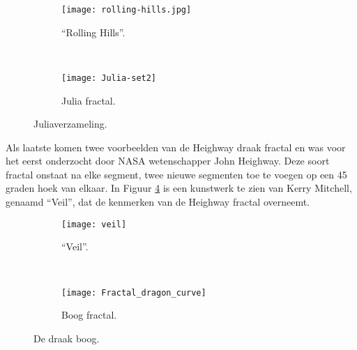 \documentclass{article}
\begin{document}
\begin{figure}[Hh]
    \centering
    \begin{subfigure}[b]{0.48\textwidth}
        \texttt{[image: rolling-hills.jpg]}
        \caption{``Rolling Hills''.}
        \label{fig:rolling-hills}
    \end{subfigure}
    ~ 
    \begin{subfigure}[b]{0.48\textwidth}
        \texttt{[image: Julia-set2]}
        \caption{Julia fractal.}
        \label{fig:julia-fractal}
    \end{subfigure}%
    \caption{Juliaverzameling.}
    \label{fig:julia-sets}
\end{figure}

Als laatste komen twee voorbeelden van de Heighway draak fractal en was voor het eerst onderzocht door NASA wetenschapper John Heighway. Deze soort fractal onstaat na elke segment, twee nieuwe segmenten toe te voegen op een 45 graden hoek van elkaar. In Figuur \ref{fig:veil} is een kunstwerk te zien van Kerry Mitchell, genaamd ``Veil'', dat de kenmerken van de Heighway fractal overneemt.

\begin{figure}[Hh]
    \centering
    \begin{subfigure}[b]{0.48\textwidth}
        \texttt{[image: veil]}
        \caption{``Veil''.}
        \label{fig:veil}
    \end{subfigure}
    ~ 
    \begin{subfigure}[b]{0.48\textwidth}
        \texttt{[image: Fractal\_dragon\_curve]}
        \caption{Boog fractal.}
        \label{fig:julia-fractal}
    \end{subfigure}%
    \caption{De draak boog.}
    \label{fig:julia-sets}
\end{figure}
\end{document}
